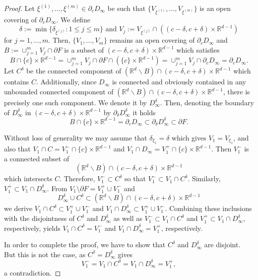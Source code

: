 \documentclass[10pt,a4paper]{amsart}
\newcommand{\R}{\mathbb R}
\begin{document}
\begin{proof}
Let $\xi^{(1)},\ldots,\xi^{(m)}\in\partial_c D_\infty$ be such that $\{V_{\xi^{(1)}},\ldots, V_{\xi^{(m)}}\}$ is an open covering of $\partial_c D_\infty$. We define
	$$\delta:=\min\{\delta_{\xi^{(j)}}: 1\leq j\leq  m\}\text{ and }  V_j:=V_{\xi^{(j)}}\cap((c-\delta,c+\delta)\times\R^{d-1})$$
for $j=1,\ldots,m$.
Then, $\{V_1,\ldots, V_m\}$  
remains an open covering of $\partial _c D_\infty$ and $B:=\cup_{j=1}^m V_j\cap \partial F$ is a subset of $(c-\delta,c+\delta)\times \R^{d-1}$ which satisfies
$$B\cap \{c\}\times\R^{d-1}=\cup_{j=1}^m V_j\cap \partial F\cap(\{c\}\times\R^{d-1})=\cup_{j=1}^m V_j\cap \partial_c D_\infty=\partial_c D_\infty.$$
Let $C^\delta$ be the connected component of $(\R^d\backslash B)\cap (c-\delta,c+\delta)\times\R^{d-1}$ which contains $C$. Additionally, since $D_\infty$ is connected and obviously contained in any unbounded connected component of $(\R^d\backslash B)\cap (c-\delta,c+\delta)\times\R^{d-1}$, 
there is precisely one such component. We denote it by $D_\infty^\delta$. Then, denoting the boundary of $D_\infty^\delta$ in $(c-\delta,c+\delta)\times \R^{d-1}$ by $\partial_\delta D_\infty^\delta$ it holds
	$$B\cap\{c\}\times\R^{d-1}=\partial_c D_\infty\subset \partial_\delta D_\infty^\delta\subset\partial F.$$ 

Without loss of generality we may assume that $\delta_{\xi_1}=\delta$ which gives $V_1=V_{\xi_1}$, and also that $V_1\cap C=V_1^-\cap\{c\}\times\R^{d-1}$ and $V_1\cap D_\infty=V_1^+\cap\{c\}\times\R^{d-1}$. Then $V_1^-$ is a connected subset of 
$$(\R^d\backslash B)\cap (c-\delta,c+\delta)\times\R^{d-1}$$ which intersects $C$. Therefore, $V_1^-\subset C^\delta$ so that $V_1^-\subset V_1\cap C^\delta$. Similarly, $V_1^+\subset V_1\cap D_\infty^\delta$. From $V_1\setminus\partial F=V_1^+\cup V_1^-$ and
$$D_\infty^\delta\cup C^\delta\subset (\R^d\backslash B)\cap (c-\delta,c+\delta)\times\R^{d-1}$$
we derive $V_1\cap C^\delta\subset V_1^+\cup V_1^-$ and $V_1\cap D_\infty^\delta\subset V_1^+\cup V_1^-$. Combining these inclusions with the disjointness of $C^\delta$ and $D_\infty^\delta$ as well as  $V_1^-\subset V_1\cap C^\delta$ and $V_1^+\subset V_1\cap D_\infty^\delta$, respectively, yields $V_1\cap C^\delta=V_1^-$ and $V_1\cap D_\infty^\delta=V_1^+$, respectively.

In order to complete the proof, we have to show that $C^\delta$ and $D_\infty^\delta$ are disjoint. But this is not the case, as $C^\delta=D_\infty^\delta$ gives
$$V_1^-=V_1\cap C^\delta=V_1\cap D_\infty^\delta=V_1^+,$$
a contradiction. 
\end{proof}
\end{document}

